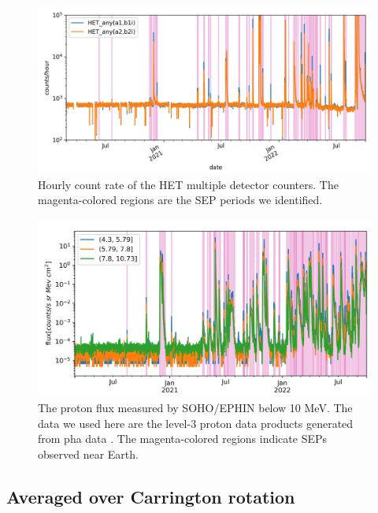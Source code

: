 \begin{figure}
    \centering
    \includegraphics[width = \textwidth]{images/ACR/SOLO-lvl2-trriger-V2.png}
    \caption[The multiple detector counters of \ac{HET}]{Hourly count rate of the \ac{HET} multiple detector counters. The magenta-colored regions are the \ac{SEP} periods we identified.}
    \label{Fig:solo-lvl2}
\end{figure}



\begin{figure}
    \centering
    \includegraphics[width = \textwidth]{images/ACR/SOLO-EPHIN-l3i-log2+6-proton-6H-V2.png}
    \caption[The proton intensity profile observed by \ac{EPHIN}]{The proton flux measured by \ac{SOHO}/\ac{EPHIN} below 10 MeV. The data we used here are the level-3 proton data products generated from pha data \citep{kuehl2020JSWSC}. The magenta-colored regions indicate \acp{SEP} observed near Earth.}
    \label{Fig:SOHO_EPHIN_Proton_flux}
\end{figure}

\subsection*{Averaged over Carrington rotation}

